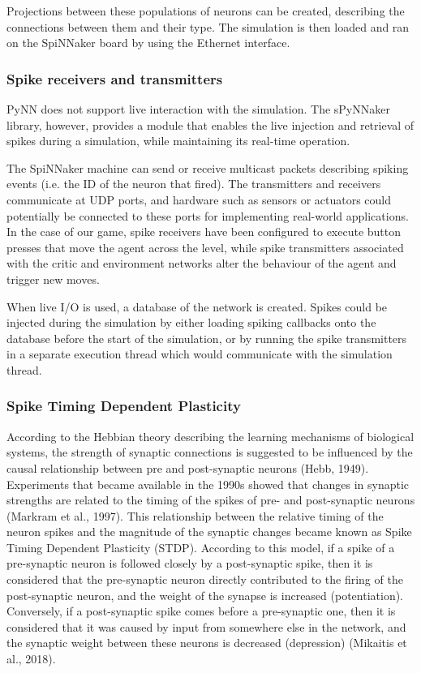 \documentclass[10pt]{article}
\begin{document}
    Projections between these populations of neurons can be created, describing the connections between them and their type. The simulation is then loaded and ran on the SpiNNaker board by using the Ethernet interface.

    \subsubsection{Spike receivers and transmitters}

    PyNN does not support live interaction with the simulation. The sPyNNaker library, however, provides a module that enables the live injection and retrieval of spikes during a simulation, while maintaining its real-time operation.

    The SpiNNaker machine can send or receive multicast packets describing spiking events (i.e. the ID of the neuron that fired). The transmitters and receivers communicate at UDP ports, and hardware such as sensors or actuators could potentially be connected to these ports for implementing real-world applications. In the case of our game, spike receivers have been configured to execute button presses that move the agent across the level, while spike transmitters associated with the critic and environment networks alter the behaviour of the agent and trigger new moves.

    When live I/O is used, a database of the network is created. Spikes could be injected during the simulation by either loading spiking callbacks onto the database before the start of the simulation, or by running the spike transmitters in a separate execution thread which would communicate with the simulation thread.

    \subsubsection{Spike Timing Dependent Plasticity}

    According to the Hebbian theory describing the learning mechanisms of biological systems, the strength of synaptic connections is suggested to be influenced by the causal relationship between pre and post-synaptic neurons (Hebb, 1949). Experiments that became available in the 1990s showed that changes in synaptic strengths are related to the timing of the spikes of pre- and post-synaptic neurons (Markram et al., 1997). This relationship between the relative timing of the neuron spikes and the magnitude of the synaptic changes became known as Spike Timing Dependent Plasticity (STDP). According to this model, if a spike of a pre-synaptic neuron is followed closely by a post-synaptic spike, then it is considered that the pre-synaptic neuron directly contributed to the firing of the post-synaptic neuron, and the weight of the synapse is increased (potentiation). Conversely, if a post-synaptic spike comes before a pre-synaptic one, then it is considered that it was caused by input from somewhere else in the network, and the synaptic weight between these neurons is decreased (depression) (Mikaitis et al., 2018).
\end{document}

